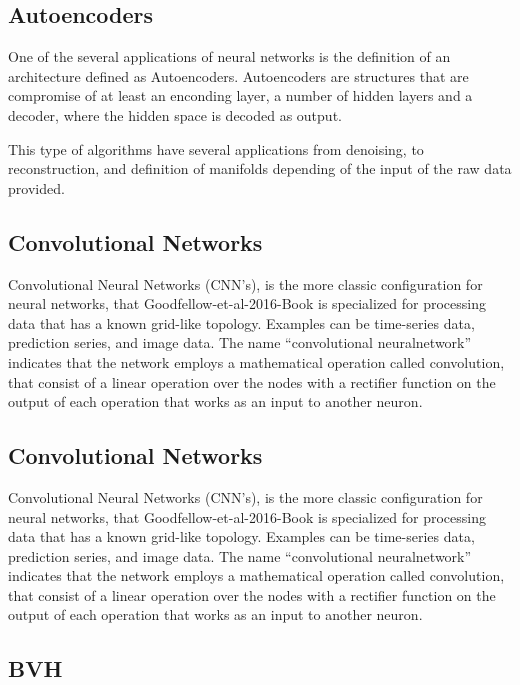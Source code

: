 \subsection{Autoencoders}  \label{subSec:Autoecoders}

One of the several applications of neural networks is the definition of an architecture defined as Autoencoders. Autoencoders are structures that are compromise of at least an enconding layer, a number of hidden layers and a decoder, where the hidden space is decoded as output.

This type of algorithms have several applications from denoising, to reconstruction, and  definition of manifolds depending of the input of the raw data provided. 

\subsection{Convolutional Networks}  \label{subSec:ConvolutionalNetworks}

\citep{Goodfellow-et-al-2016-Book:2018} Convolutional Neural Networks (CNN's), is the more classic configuration for neural networks, that {Goodfellow-et-al-2016-Book} is specialized 
for processing data that has a known grid-like topology. Examples can be time-series data, prediction series, and image data. 
The name “convolutional neuralnetwork” indicates that the network employs a mathematical operation called convolution, that consist of a linear operation 
over the nodes with a rectifier function on the output of each operation that works as an input to another neuron.

\subsection{Convolutional Networks}  \label{subSec:ConvolutionalNetworks}

Convolutional Neural Networks (CNN's), is the more classic configuration for neural networks, that {Goodfellow-et-al-2016-Book} is specialized 
for processing data that has a known grid-like topology. Examples can be time-series data, prediction series, and image data. 
The name “convolutional neuralnetwork” indicates that the network employs a mathematical operation called convolution, that consist of a linear operation 
over the nodes with a rectifier function on the output of each operation that works as an input to another neuron.

\subsection{BVH}  \label{subSec:BVH}

